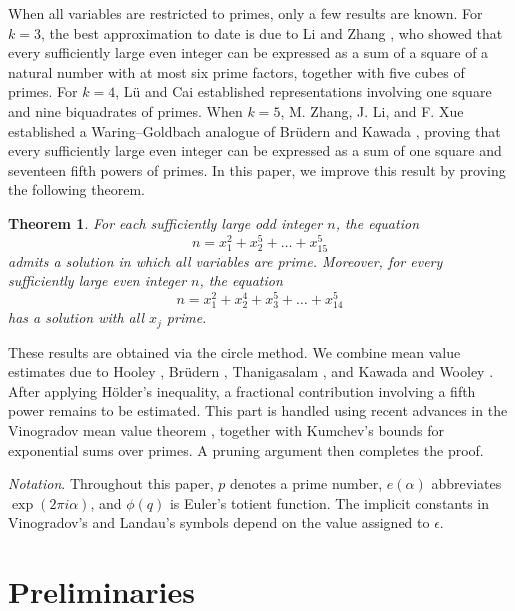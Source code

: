 \documentclass{article}
\theoremstyle{plain}
\newtheorem{theorem}{Theorem}
\begin{document}
When all variables are restricted to primes, only a few results are known. For $k=3$, the best approximation to date is due to Li and Zhang \cite{LiZhang2018}, who showed that every sufficiently large even integer can be expressed as a sum of a square of a natural number with at most six prime factors, together with five cubes of primes. For $k=4$, L\"u and Cai \cite{LuCai2019} established representations involving one square and nine biquadrates of primes. When $k=5$, M. Zhang, J. Li, and F. Xue \cite{zhang2024arXiv240203076Z} established a Waring–Goldbach analogue of Br\"udern and Kawada \cite{BrudernKawada2011}, proving that every sufficiently large even integer can be expressed as a sum of one square and seventeen fifth powers of primes. In this paper, we improve this result by proving the following theorem.

\begin{theorem}\label{teo2}
    For each sufficiently large odd integer $n$, the equation
    \begin{equation}\label{eq2}
        n=x_1^2+x_2^5+\dots+x_{15}^5
    \end{equation}
    admits a solution in which all variables are prime. Moreover, for every sufficiently large even integer $n$, the equation
    \begin{equation}\label{eq3}
        n=x_1^2+x_2^4+x_3^5+\dots+x_{14}^5
    \end{equation}
    has a solution with all $x_j$ prime.
\end{theorem}

These results are obtained via the circle method. We combine mean value estimates due to Hooley \cite{Hooley1981}, Br\"udern \cite{Bru87}, Thanigasalam \cite{Thanigasalam1989,Thanigasalam1994}, and Kawada and Wooley \cite{KawadaWooley2001}. After applying H\"older’s inequality, a fractional contribution involving a fifth power remains to be estimated. This part is handled using recent advances in the Vinogradov mean value theorem \cite{KumWoo16}, together with Kumchev’s bounds \cite{Kum06} for exponential sums over primes. A pruning argument then completes the proof.

\textit{Notation}. Throughout this paper, $p$ denotes a prime number, $e(\alpha)$ abbreviates $\exp(2\pi i \alpha)$, and $\phi(q)$ is Euler’s totient function. The implicit constants in Vinogradov’s and Landau’s symbols depend on the value assigned to $\epsilon$.


\section{Preliminaries}
\end{document}
